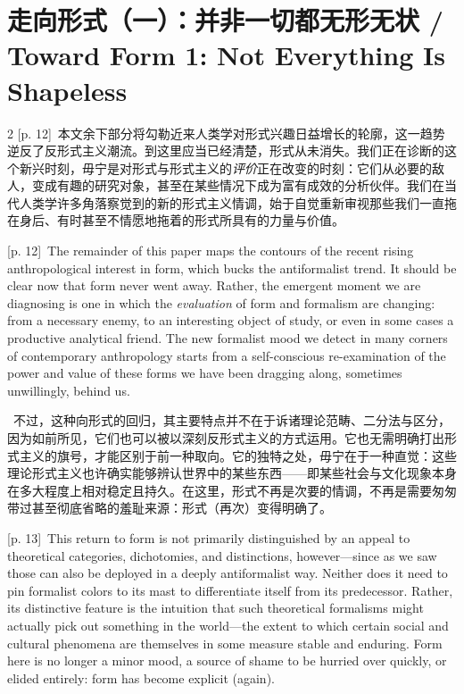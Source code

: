 \documentclass[10pt,a4paper]{article}
\begin{document}
\section*{走向形式（一）：并非一切都无形无状 / Toward Form 1: Not Everything Is Shapeless}
\begin{paracol}{2}
{\scriptsize\color{gray} [p. 12]}\ 本文余下部分将勾勒近来人类学对形式兴趣日益增长的轮廓，这一趋势逆反了反形式主义潮流。到这里应当已经清楚，形式从未消失。我们正在诊断的这个新兴时刻，毋宁是对形式与形式主义的\textit{评价}正在改变的时刻：它们从必要的敌人，变成有趣的研究对象，甚至在某些情况下成为富有成效的分析伙伴。我们在当代人类学许多角落察觉到的新的形式主义情调，始于自觉重新审视那些我们一直拖在身后、有时甚至不情愿地拖着的形式所具有的力量与价值。\par
\switchcolumn
{\scriptsize\color{gray} [p. 12]}\ The remainder of this paper maps the contours of the recent rising anthropological interest in form, which bucks the antiformalist trend. It should be clear now that form never went away. Rather, the emergent moment we are diagnosing is one in which the \textit{evaluation} of form and formalism are changing: from a necessary enemy, to an interesting object of study, or even in some cases a productive analytical friend. The new formalist mood we detect in many corners of contemporary anthropology starts from a self-conscious re-examination of the power and value of these forms we have been dragging along, sometimes unwillingly, behind us.\par
\switchcolumn*
{\scriptsize\color{gray} [p. 13]}\ 不过，这种向形式的回归，其主要特点并不在于诉诸理论范畴、二分法与区分，因为如前所见，它们也可以被以深刻反形式主义的方式运用。它也无需明确打出形式主义的旗号，才能区别于前一种取向。它的独特之处，毋宁在于一种直觉：这些理论形式主义也许确实能够辨认世界中的某些东西——即某些社会与文化现象本身在多大程度上相对稳定且持久。在这里，形式不再是次要的情调，不再是需要匆匆带过甚至彻底省略的羞耻来源：形式（再次）变得明确了。\par
\switchcolumn
{\scriptsize\color{gray} [p. 13]}\ This return to form is not primarily distinguished by an appeal to theoretical categories, dichotomies, and distinctions, however—since as we saw those can also be deployed in a deeply antiformalist way. Neither does it need to pin formalist colors to its mast to differentiate itself from its predecessor. Rather, its distinctive feature is the intuition that such theoretical formalisms might actually pick out something in the world—the extent to which certain social and cultural phenomena are themselves in some measure stable and enduring. Form here is no longer a minor mood, a source of shame to be hurried over quickly, or elided entirely: form has become explicit (again).\par

\end{paracol}
\end{document}
